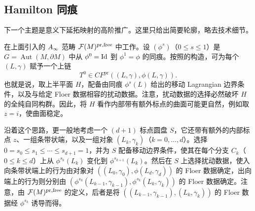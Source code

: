 \subsection{Hamilton 同痕}\label{sec:10c}
下一个主题是意义下延拓映射的高阶推广。这里只给出简要轮廓，略去技术细节。

在上面引入的 $A_\infty$ 范畴 $\mathcal F(M)^{\mathrm{pr},\mathrm{free}}$ 中工作。设 $(\phi^s)$（$0\leq s\leq1$）是 $G=\operatorname{Aut}(M,\partial M)$ 中从 $\phi^0=\operatorname{Id}$ 到 $\phi^1=\phi$ 的同痕。按照的构造，可为每个 $(L,\gamma)$ 赋予一个上链
\[
T^0\in CF^{\mathrm{pr}}((L,\gamma),\phi(L,\gamma)).
\]
也就是说，取上半平面 $H$，配备由同痕 $\phi^s(L)$ 给出的移动 Lagrangian 边界条件，以及与给定 Floer 数据相容的扰动数据。注意，扰动数据的选择必然破坏 $H$ 的全纯自同构群。因此，将 $H$ 看作内部带有额外标点的曲面可能更自然，例如取 $z=i$，使曲面稳定。

沿着这个思路，更一般地考虑一个 $(d+1)$ 标点圆盘 $S$，它还带有额外的内部标点 $z$、一组条带状端，以及一组对象 $(L_k,\gamma_k)$（$k=0,\ldots,d$）。选择 $0=s_0\leq s_1\leq\cdots\leq s_{d+1}=1$，并为 $S$ 配备移动边界条件，使其在每个分支 $C_k$（$0\leq k\leq d$）上从 $\phi^{s_k}(L_k)$ 变化到 $\phi^{s_{k+1}}(L_k)$。然后在 $S$ 上选择扰动数据，使入向条带状端上的行为由对象对 $((L_0,\gamma_0),\phi(L_d,\gamma_d))$ 的 Floer 数据确定，出向端上的行为则分别由 $(\phi^{s_k}(L_{k-1},\gamma_{k-1}),\phi^{s_k}(L_k,\gamma_k))$ 的 Floer 数据确定。注意，由 $\mathcal F(M)^{\mathrm{pr},\mathrm{free}}$ 的定义，后者是将 $((L_{k-1},\gamma_{k-1}),(L_k,\gamma_k))$ 的 Floer 数据经 $\phi^{s_k}$ 诱导而得。

